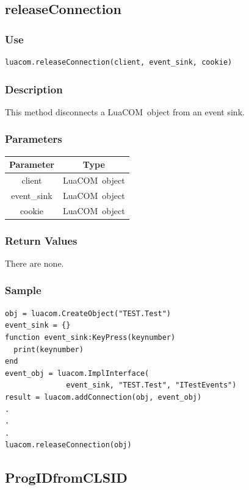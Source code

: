 \documentclass[11pt,a4paper,english]{report}
\newcommand{\techname}[1]{\mbox{#1}}
\newcommand{\luacom}{\techname{LuaCOM}}
\begin{document}
\subsection*{releaseConnection}

\subsubsection*{Use}

\begin{verbatim}
luacom.releaseConnection(client, event_sink, cookie)
\end{verbatim}

\subsubsection*{Description}
This method disconnects a \luacom\ object from an event sink.

\subsubsection*{Parameters}

\begin{tabular}{|c|c|}
\hline
\bf Parameter & \bf Type  \\ \hline \hline
client & \luacom\ object  \\ \hline
event\_sink & \luacom\ object  \\ \hline
cookie & \luacom\ object  \\ \hline
\end{tabular}

\subsubsection*{Return Values}
There are none.

\subsubsection*{Sample}
\begin{verbatim}
obj = luacom.CreateObject("TEST.Test")
event_sink = {}
function event_sink:KeyPress(keynumber)
  print(keynumber)
end
event_obj = luacom.ImplInterface(
              event_sink, "TEST.Test", "ITestEvents")
result = luacom.addConnection(obj, event_obj)
.
.
.
luacom.releaseConnection(obj)
\end{verbatim}

\subsection*{ProgIDfromCLSID}
\end{document}
